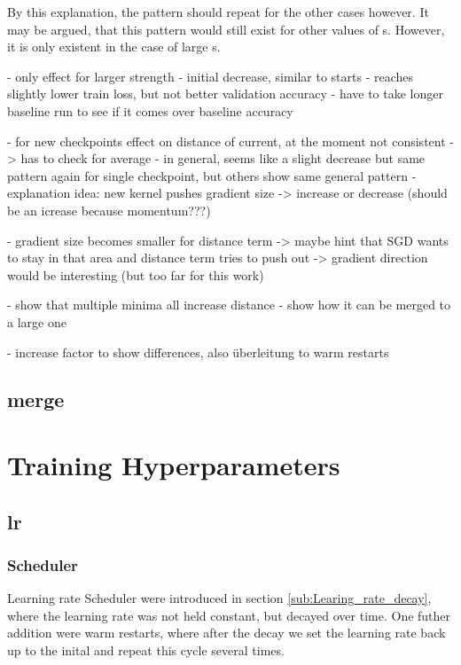 By this explanation, the pattern should repeat for the other cases however. It
may be argued, that this pattern would still exist for other values of s.
However, it is only existent in the case of large s.




- only effect for larger strength
- initial decrease, similar to starts
- reaches slightly lower train loss, but not better validation accuracy
- have to take longer baseline run to see if it comes over baseline accuracy

- for new checkpoints effect on distance of current, at the moment not consistent -> has to check for average
- in general, seems like a slight decrease but same pattern again for single checkpoint, but others show same general pattern
- explanation idea: new kernel pushes gradient size -> increase or decrease (should be an icrease because momentum???)

- gradient size becomes smaller for distance term -> maybe hint that SGD wants
to stay in that area and distance term tries to push out -> gradient direction
would be interesting (but too far for this work)



- show that multiple minima all increase distance
- show how it can be merged to a large one

- increase factor to show differences, also überleitung to warm restarts
\subsection{merge}

\section{Training Hyperparameters}\label{res:Training}
\subsection{lr}\label{res:Learning rate}
\subsubsection{Scheduler}
Learning rate Scheduler were introduced in section \ref{sub:Learing_rate_decay},
where the learning rate was not held constant, but decayed over time. One futher
addition were warm restarts, where after the decay we set the learning rate back
up to the inital and repeat this cycle several times.

